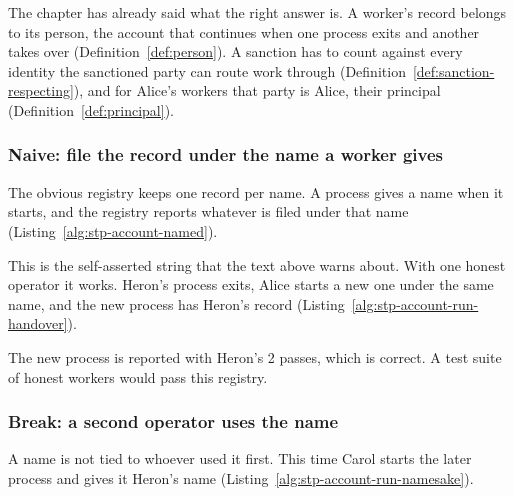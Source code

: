 The chapter has already said what the right answer is. A worker's record
belongs to its person, the account that continues when one process
exits and another takes over (Definition~\ref{def:person}). A sanction
has to count against every identity the sanctioned party can route work
through (Definition~\ref{def:sanction-respecting}), and for Alice's
workers that party is Alice, their principal
(Definition~\ref{def:principal}).

\subsubsection{Naive: file the record under the name a worker gives}

The obvious registry keeps one record per name. A process gives a name
when it starts, and the registry reports whatever is filed under that
name (Listing~\ref{alg:stp-account-named}).


This is the self-asserted string that the text above warns about. With
one honest operator it works. Heron's process exits, Alice starts a new
one under the same name, and the new process has Heron's record
(Listing~\ref{alg:stp-account-run-handover}).


The new process is reported with Heron's 2 passes, which is correct. A
test suite of honest workers would pass this registry.

\subsubsection{Break: a second operator uses the name}

A name is not tied to whoever used it first. This time Carol starts the
later process and gives it Heron's name
(Listing~\ref{alg:stp-account-run-namesake}).


